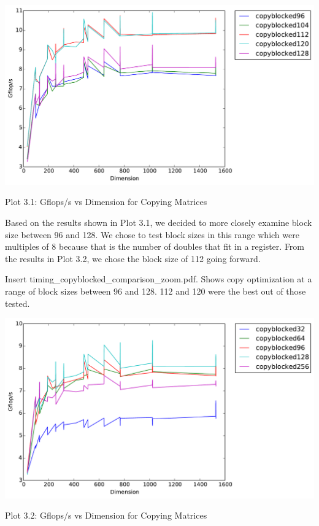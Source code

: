 \documentclass[12pt]{article}
\begin{document}
\begin{center}
\includegraphics[width=16cm]{timing_copyblocked_comparison_zoom.pdf}

Plot 3.1: Gflops/s vs Dimension for Copying Matrices
\end{center}

Based on the results shown in Plot 3.1, we decided to more closely examine block size between 96 and 128. We chose to test block sizes in this range which were multiples of 8 because that is the number of doubles that fit in a register. From the results in Plot 3.2, we chose the block size of 112 going forward.

Insert timing\_copyblocked\_comparison\_zoom.pdf. Shows copy optimization at a range of block sizes between 96 and 128. 112 and 120 were the best out of those tested.

\begin{center}
\includegraphics[width=16cm]{timing_copyblocked_comparison.pdf}

Plot 3.2: Gflops/s vs Dimension for Copying Matrices
\end{center}
\end{document}

